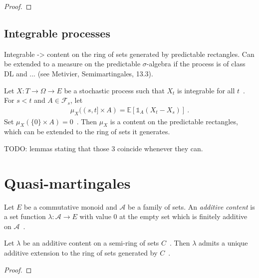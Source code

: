\begin{proof}

\end{proof}




\subsection{Integrable processes}

Integrable -> content on the ring of sets generated by predictable rectangles.
Can be extended to a measure on the predictable $\sigma$-algebra if the process is of class DL and ... (see Metivier, Semimartingales, 13.3).

Let $X : T \to \Omega \to E$ be a stochastic process such that $X_t$ is integrable for all $t$~.
For $s < t$ and $A \in \mathcal{F}_s$, let
\begin{align*}
  \mu_X((s, t] \times A) = \mathbb{E}[\mathbb{1}_A (X_t - X_s)]
  \: .
\end{align*}
Set $\mu_X(\{0\} \times A) = 0$~.
Then $\mu_X$ is a content on the predictable rectangles, which can be extended to the ring of sets it generates.

TODO: lemmas stating that those 3 coincide whenever they can.


\section{Quasi-martingales}

\begin{definition}\label{def:addContent}
  \mathlibok
  Let $E$ be a commutative monoid and $\mathcal{A}$ be a family of sets.
  An \emph{additive content} is a set function $\lambda : \mathcal{A} \to E$
  with value $0$ at the empty set
  which is finitely additive on $\mathcal{A}$~.
\end{definition}

\begin{lemma}\label{lem:addContent_extension}
  \mathlibok
  Let $\lambda$ be an additive content on a semi-ring of sets $C$~.
  Then $\lambda$ admits a unique additive extension to the ring of sets generated by $C$~.
\end{lemma}

\begin{proof}\leanok
\end{proof}

